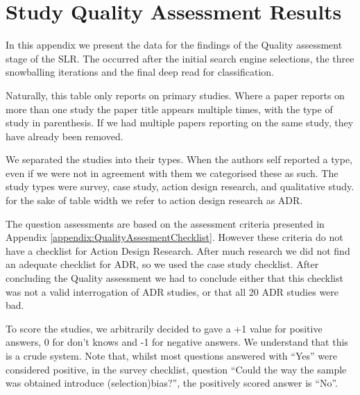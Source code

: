 \chapter{Study Quality Assessment Results} 
\label{appendix:Quality_Assessment_Results} 

In this appendix we present the data for the findings of the Quality assessment stage of the SLR.
The occurred after the initial search engine selections, the three snowballing iterations and the final deep read for classification.

Naturally, this table only reports on primary studies.
Where a paper reports on more than one study the paper title appears multiple times, with the type of study in parenthesis.
If we had multiple papers reporting on the same study, they have already been removed.

We separated the studies into their types.
When the authors self reported a type, even if we were not in agreement with them we categorised these as such.
The study types were survey, case study, action design research, and qualitative study.
for the sake of table width we refer to action design research as ADR.

The question assessments are based on the assessment criteria presented in Appendix \ref{appendix:QualityAssesmentChecklist}.
However these criteria do not have a checklist for Action Design Research.
After much research we did not find an adequate checklist for ADR, so we used the case study checklist.
After concluding the Quality assessment we had to conclude either that this checklist was not a valid interrogation of ADR studies, or that all 20 ADR studies were bad.

To score the studies, we arbitrarily decided to gave a +1 value for positive answers, 0 for don't knows and -1 for negative answers.
We understand that this is a crude system.
Note that, whilst most questions answered with ``Yes'' were considered positive, in the survey checklist, question ``Could the way the sample was obtained introduce (selection)bias?'', the positively scored answer is ``No''.

